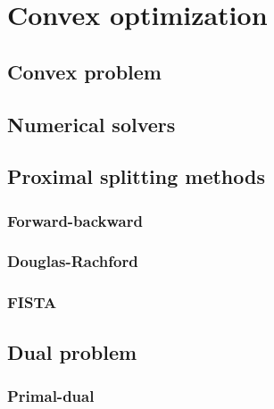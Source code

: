 \documentclass[a4paper,12pt,twoside]{report}
\begin{document}
\chapter{Convex optimization}

\section{Convex problem}

\section{Numerical solvers}

\section{Proximal splitting methods}

\subsection{Forward-backward}

\subsection{Douglas-Rachford}

\subsection{FISTA}

\section{Dual problem}

\subsection{Primal-dual}
\end{document}
